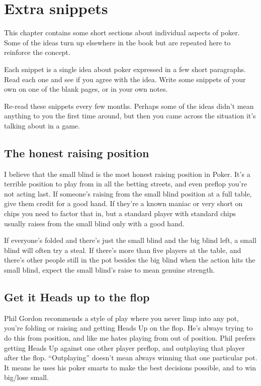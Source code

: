 \chapter{Extra snippets}


This chapter contains some short sections about individual aspects
of poker. Some of the ideas turn up elsewhere in the book but are
repeated here to reinforce the concept.

Each snippet is a single idea about poker expressed in a few
short paragraphs. Read each one and see if you agree with the idea.
Write some snippets of your own on one of the blank pages, or
in your own notes.

Re-read these snippets every few months. Perhaps some of the
ideas didn't mean anything to you the first time around, but
then you came across the situation it's talking about in
a game.

\section{The honest raising position}

I believe that the small blind is the most honest raising
position in Poker. It's a terrible position to play from
in all the betting streets, and even preflop you're not
acting last. If someone's raising from the small blind
position at a full table, give them credit for a good hand.
If they're a known maniac or very short on chips you need to
factor that in, but a standard player with standard chips usually
raises from the small blind only with a good hand.

If everyone's folded and there's just the small blind and the
big blind left, a small blind will often try a steal. If there's
more than five players at the table, and there's other people
still in the pot besides the big blind when the action hits the small
blind, expect the small blind's raise to mean genuine strength.

\section{Get it Heads up to the flop}

Phil Gordon recommends a style of play where you never limp into any pot,
you're folding or raising and getting Heads Up on the flop. He's always trying
to do this from position, and like me hates playing from out of position.
Phil prefers getting Heads Up against one other player preflop, and
outplaying that player after the flop. ``Outplaying'' doesn't mean
always winning that one particular pot. It means he uses his poker
smarts to make the best decisions possible, and to win big/lose small.

